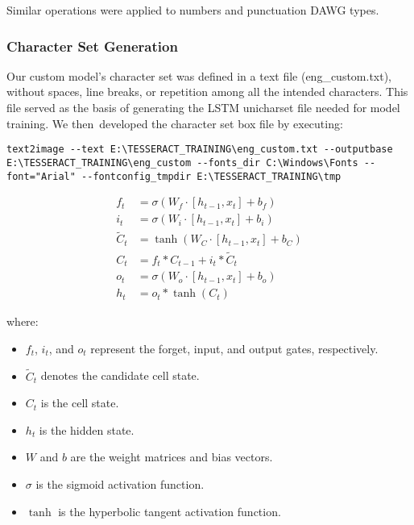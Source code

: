 Similar operations were applied to numbers and  punctuation DAWG types.

\subsubsection{Character Set Generation}

Our custom model's character set was defined in a text file (eng\_custom.txt), without spaces, line breaks, or repetition among all the intended characters. This file served as the basis of generating the LSTM unicharset file needed for model training. We then developed the character set box file by executing: 


\begin{Verbatim}[breaklines=true]
text2image --text E:\TESSERACT_TRAINING\eng_custom.txt --outputbase E:\TESSERACT_TRAINING\eng_custom --fonts_dir C:\Windows\Fonts --font="Arial" --fontconfig_tmpdir E:\TESSERACT_TRAINING\tmp
\end{Verbatim}





\begin{align}
    f_t &= \sigma(W_f \cdot [h_{t-1}, x_t] + b_f) \\
    i_t &= \sigma(W_i \cdot [h_{t-1}, x_t] + b_i) \\
    \tilde{C}_t &= \tanh(W_C \cdot [h_{t-1}, x_t] + b_C) \\
    C_t &= f_t * C_{t-1} + i_t * \tilde{C}_t \\
    o_t &= \sigma(W_o \cdot [h_{t-1}, x_t] + b_o) \\
    h_t &= o_t * \tanh(C_t)
\end{align}

where:
\begin{itemize}
    \item $f_t$, $i_t$, and $o_t$ represent the forget, input, and output gates, respectively.
    \item $\tilde{C}_t$ denotes the candidate cell state.
    \item $C_t$ is the cell state.
    \item $h_t$ is the hidden state.
    \item $W$ and $b$ are the weight matrices and bias vectors.
    \item $\sigma$ is the sigmoid activation function.
    \item $\tanh$ is the hyperbolic tangent activation function.
\end{itemize}